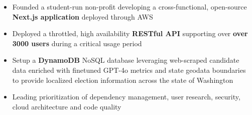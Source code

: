 \begin{itemize}
    \item Founded a student-run non-profit developing a cross-functional, open-source \textbf{Next.js application} deployed through AWS
    \item Deployed a throttled, high availability \textbf{RESTful API} supporting over \textbf{over 3000 users} during a critical usage period
    \item Setup a \textbf{DynamoDB} NoSQL database leveraging web-scraped candidate data enriched with finetuned GPT-4o metrics and state geodata boundaries to provide localized election information across the state of Washington
    \item Leading prioritization of dependency management, user research, security, cloud architecture and code quality
\end{itemize}